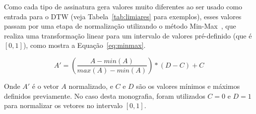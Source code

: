 
Como cada tipo de assinatura gera valores muito diferentes ao ser usado como entrada para o DTW (veja Tabela~\ref{tab:limiares} para exemplos), esses valores passam por uma etapa de normalização utilizando o método Min-Max~\cite{al2006data}, que realiza uma transformação linear para um intervalo de valores pré-definido (que é $[0, 1]$), como mostra a Equação~\ref{eq:minmax}.

$$
\label{eq:minmax}
A' = \left(\frac{A - min(A)}{max(A) - min(A)}\right) * (D - C) + C
$$

Onde $A'$ é o vetor $A$ normalizado, e $C$ e $D$ são os valores mínimos e máximos definidos previamente. No caso desta monografia, foram utilizados $C = 0$ e $D = 1$ para normalizar os vetores no intervalo $[0, 1]$.





